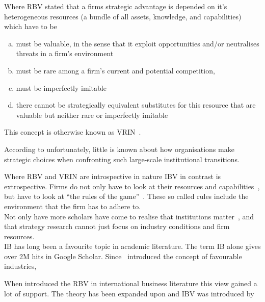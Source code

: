 Where \gls{RBV} stated that a firms strategic advantage is depended on it's heterogeneous resources (a bundle of all assets, knowledge, and capabilities) which have to be 
\begin{enumerate}[(a)]
\item must be valuable, in the sense that it exploit opportunities and/or neutralises threats in a firm’s environment
\item must be rare among a firm’s current and potential competition, 
\item must be imperfectly imitable
\item  there cannot be strategically equivalent substitutes for this resource that are valuable but neither rare or imperfectly imitable 
\end{enumerate} 
This concept is otherwise known as VRIN~\cite{Barney:1991}. 

According to \cite{Peng:2003} unfortunately, little is known about how organisations make strategic choices when confronting such large-scale institutional transitions.

Where \gls{RBV} and VRIN are introspective in nature \gls{IBV} in contrast is extrospective. Firms do not only have to look at their resources and capabilities~\cite{Barney:1991}, but have to look at ``the rules of the game''~\cite{Scott:2001}. These so called rules include the environment that the firm \nme has to adhere to.\\

Not only have   more scholars have come to realise that institutions matter~\cite{Powell:1991,Scott:2001}, and that strategy research cannot just focus on industry conditions and firm resources.\\

\Gls{IB} has long been a favourite topic in academic literature. The term \gls{IB} alone gives over 2M hits in Google Scholar. Since~\cite{Porter:1980} introduced the concept of favourable industries, 

When introduced the \gls{RBV} in international business literature this view gained a lot of support. 
The theory has been expanded upon and \gls{IBV} was introduced by~\cite{Kostova:1999,Meyer:2009,Wang:2012}